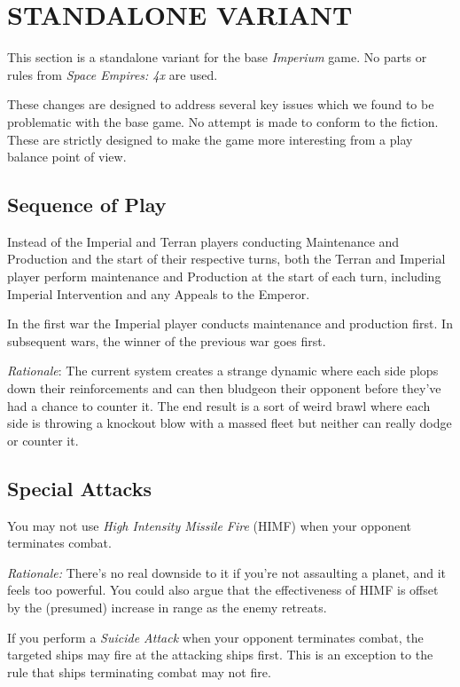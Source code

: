 \section{STANDALONE VARIANT}
\hfill

This section is a standalone variant for the base \textit{Imperium} game. No parts or rules from \textit{Space Empires: 4x} are used.

These changes are designed to address several key issues which we found to be problematic with the base game. No attempt is made to conform to the fiction. These are strictly designed to make the game more interesting from a play balance point of view.

\subsection{Sequence of Play}

Instead of the Imperial and Terran players conducting Maintenance and Production and the start of their respective turns, both the Terran and Imperial player perform maintenance and Production at the start of each turn, including Imperial Intervention and any Appeals to the Emperor.

In the first war the Imperial player conducts maintenance and production first. In subsequent wars, the winner of the previous war goes first.

\textit{Rationale}: The current system creates a strange dynamic where each side plops down their reinforcements and can then bludgeon their opponent before they've had a chance to counter it. The end result is a sort of weird brawl where each side is throwing a knockout blow with a massed fleet but neither can really dodge or counter it.

\subsection{Special Attacks}

You may not use \textit{High Intensity Missile Fire} (HIMF) when your opponent terminates combat.

\textit{Rationale:} There's no real downside to it if you're not assaulting a planet, and it feels too powerful. You could also argue that the effectiveness of HIMF is offset by the (presumed) increase in range as the enemy retreats.

If you perform a \textit{Suicide Attack} when your opponent terminates combat, the targeted ships may fire at the attacking ships first. This is an exception to the rule that ships terminating combat may not fire.

